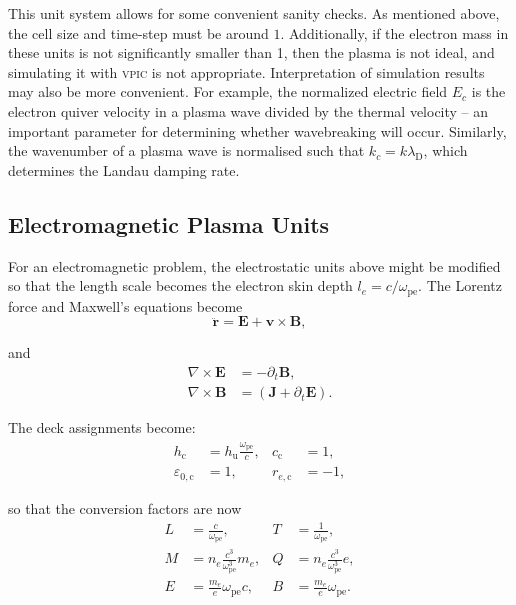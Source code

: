 \documentclass[twocolumn,10pt]{article}
\renewcommand{\vec}[1]{\mathbf{#1}}
\newcommand{\omegap}{\omega_{\mathrm{pe}}}
\newcommand{\ldebye}{\lambda_{\mathrm{D}}}
\begin{document}
This unit system allows for some convenient sanity checks.
As mentioned above, the cell size and time-step must be around $1$.
Additionally, if the electron mass in these units is not significantly smaller than 1, then the plasma is not ideal, and simulating it with \textsc{vpic} is not appropriate.
Interpretation of simulation results may also be more convenient.
For example, the normalized electric field $E_c$ is the electron quiver velocity in a plasma wave divided by the thermal velocity -- an important parameter for determining whether wavebreaking will occur.
Similarly, the wavenumber of a plasma wave is normalised such that $k_c = k\ldebye$, which determines the Landau damping rate.

\subsection{Electromagnetic Plasma Units}

For an electromagnetic problem, the electrostatic units above might be modified so that the length scale becomes the electron skin depth $l_e=c/\omegap$.
The Lorentz force and Maxwell's equations become
\begin{equation*}
	\ddot{\vec{r}} = \vec{E} + \vec{v} \times \vec{B},
\end{equation*}

\noindent and
\begin{align*}
	\nabla \times \vec{E} &= -\partial_t \vec{B}, \\
	\nabla \times \vec{B} &= \left(\vec{J} + \partial_t \vec{E}\right).
\end{align*}

\noindent The deck assignments become:
\begin{align*}
	h_{\mathrm{c}}             &= h_{\mathrm{u}}\frac{\omegap}{c}, &
	c_{\mathrm{c}}             &= 1, \\
	\varepsilon_{0,\mathrm{c}} &= 1, &
	r_{e,\mathrm{c}}           &= -1,
\end{align*}

\noindent so that the conversion factors are now
\begin{align*}
	L &= \frac{c}{\omega_{\mathrm{pe}}}, &
	T &= \frac{1}{\omega_{\mathrm{pe}}}, \\
	M &= n_e\frac{c^3}{\omegap^3}m_e,    &
	Q &= n_e\frac{c^3}{\omegap^3}e,      \\
	E &= \frac{m_e}{e}\omegap c,         &
	B &= \frac{m_e}{e}\omegap.
\end{align*}
\end{document}
